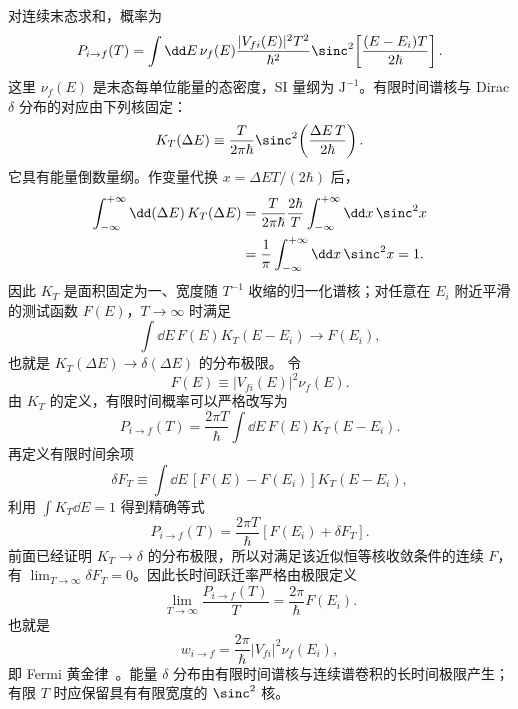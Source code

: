 \begin{derivation}
对连续末态求和，概率为
\begin{equation*}
 P_{i\to f}(T)
 =\int\dd E\,\nu_f(E)
 \frac{|V_{fi}(E)|^2T^2}{\hbar^2}
 \sinc^2\!\left[\frac{(E-E_i)T}{2\hbar}\right].
\end{equation*}
这里 $\nu_f(E)$ 是末态每单位能量的态密度，SI 量纲为 $\mathrm{J^{-1}}$。有限时间谱核与 Dirac $\delta$ 分布的对应由下列核固定：
\begin{equation*}
 K_T(\Delta E)
 \equiv
 \frac{T}{2\pi\hbar}
 \sinc^2\!\left(\frac{\Delta E\,T}{2\hbar}\right).
\end{equation*}
它具有能量倒数量纲。作变量代换 $x=\Delta E T/(2\hbar)$ 后，
\begin{align*}
 \int_{-\infty}^{+\infty}\dd(\Delta E)\,K_T(\Delta E)
 &=\frac{T}{2\pi\hbar}
 \frac{2\hbar}{T}
 \int_{-\infty}^{+\infty}\dd x\,\sinc^2x\\
 &=\frac1\pi\int_{-\infty}^{+\infty}\dd x\,\sinc^2x=1.
\end{align*}
因此 $K_T$ 是面积固定为一、宽度随 $T^{-1}$ 收缩的归一化谱核；对任意在 $E_i$ 附近平滑的测试函数 $F(E)$，$T\to\infty$ 时满足
\begin{equation*}
 \int\dd E\,F(E)K_T(E-E_i)\longrightarrow F(E_i),
\end{equation*}
也就是 $K_T(\Delta E)\to\delta(\Delta E)$ 的分布极限。
令
\begin{equation*}
F(E)\equiv |V_{fi}(E)|^2\nu_f(E).
\end{equation*}
由 $K_T$ 的定义，有限时间概率可以严格改写为
\begin{equation*}
P_{i\to f}(T)
=\frac{2\pi T}{\hbar}
\int\dd E\,F(E)K_T(E-E_i).
\end{equation*}
再定义有限时间余项
\begin{equation*}
\delta F_T
\equiv
\int\dd E\,[F(E)-F(E_i)]K_T(E-E_i),
\end{equation*}
利用 $\int K_T\dd E=1$ 得到精确等式
\begin{equation*}
P_{i\to f}(T)
=\frac{2\pi T}{\hbar}[F(E_i)+\delta F_T].
\end{equation*}
前面已经证明 $K_T\to\delta$ 的分布极限，所以对满足该近似恒等核收敛条件的连续 $F$，有 $\lim_{T\to\infty}\delta F_T=0$。因此长时间跃迁率严格由极限定义
\begin{equation*}
\lim_{T\to\infty}\frac{P_{i\to f}(T)}{T}
=\frac{2\pi}{\hbar}F(E_i).
\end{equation*}
也就是
\begin{equation*}
 w_{i\to f}=\frac{2\pi}{\hbar}|V_{fi}|^2\nu_f(E_i),
\end{equation*}
即 Fermi 黄金律~。能量 $\delta$ 分布由有限时间谱核与连续谱卷积的长时间极限产生；有限 $T$ 时应保留具有有限宽度的 $\sinc^2$ 核。
\end{derivation}

